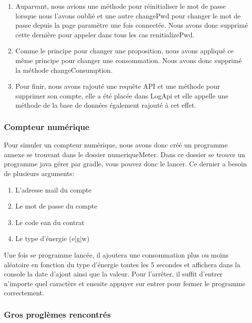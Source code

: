 \begin{enumerate}
\item Auparvant, nous avions une méthode pour réinitialiser le mot de passe lorsque nous l'avons oublié et une autre changePwd pour changer le mot de passe depuis la page paramètre une fois connectée. Nous avons donc supprimé cette dernière pour appeler dans tous les cas renitializePwd.
\item Comme le principe pour changer une proposition, nous avons appliqué ce même principe pour changer une consommation. Nous avons donc supprimé la méthode changeConsumption.
\item Pour finir, nous avons rajouté une requête API et une méthode pour supprimer son compte, elle a été placée dans LogApi et elle appelle une méthode de la base de données également rajouté à cet effet.
\end{enumerate}

\subsubsection{Compteur numérique}

\begin{flushleft}
Pour simuler un compteur numérique, nous avons donc créé un programme annexe se trouvant dans le dossier numeriqueMeter. Dans ce dossier se trouve un programme java gérer par gradle, vous pouvez donc le lancer. Ce dernier a besoin de plusieurs arguments:
\end{flushleft}

\begin{enumerate}[-]
\item L'adresse mail du compte
\item Le mot de passe du compte
\item Le code ean du contrat
\item Le type d'énergie (e|g|w)
\end{enumerate}

\begin{flushleft}
Une fois se programme lancée, il ajoutera une consommation plus ou moins aléatoire en fonction du type d'énergie toutes les 5 secondes et affichera dans la console la date d'ajout ainsi que la valeur. Pour l'arrêter, il suffit d'entrer n'importe quel caractère et ensuite appuyer sur entrer pour fermer le programme correctement.
\end{flushleft}

\subsubsection{Gros proglèmes rencontrés}

